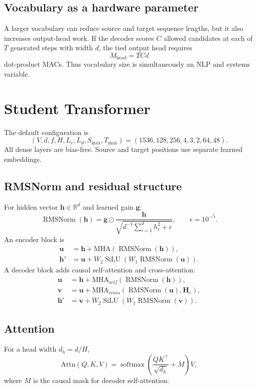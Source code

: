 \documentclass{article}
\newcommand{\R}{\mathbb{R}}
\newcommand{\rms}{\operatorname{RMSNorm}}
\newcommand{\softmax}{\operatorname{softmax}}
\newcommand{\silu}{\operatorname{SiLU}}
\begin{document}
\subsection{Vocabulary as a hardware parameter}
A larger vocabulary can reduce source and target sequence lengths, but it also increases output-head work. If the decoder scores $C$ allowed candidates at each of $T$ generated steps with width $d$, the tied output head requires
\begin{equation}
M_{\mathrm{head}}=TCd
\label{eq:head}
\end{equation}
dot-product MACs. Thus vocabulary size is simultaneously an NLP and systems variable.

\section{Student Transformer}
The default configuration is
\begin{equation}
(V,d,f,H,L_e,L_d,S_{\max},T_{\max})
=(1536,128,256,4,3,2,64,48).
\end{equation}
All dense layers are bias-free. Source and target positions use separate learned embeddings.

\subsection{RMSNorm and residual structure}
For hidden vector $\mathbf{h}\in\R^d$ and learned gain $\mathbf{g}$:
\begin{equation}
\rms(\mathbf{h})
=\mathbf{g}\odot
\frac{\mathbf{h}}
{\sqrt{d^{-1}\sum_{i=1}^{d}h_i^2+\epsilon}},
\qquad\epsilon=10^{-5}.
\end{equation}
An encoder block is
\begin{align}
\mathbf{u}&=\mathbf{h}+
\mathrm{MHA}(\rms(\mathbf{h})),\\
\mathbf{h}'&=\mathbf{u}+
W_2\silu(W_1\rms(\mathbf{u})).
\end{align}
A decoder block adds causal self-attention and cross-attention:
\begin{align}
\mathbf{u}&=\mathbf{h}+
\mathrm{MHA}_{self}(\rms(\mathbf{h})),\\
\mathbf{v}&=\mathbf{u}+
\mathrm{MHA}_{cross}(\rms(\mathbf{u}),\mathbf{H}_e),\\
\mathbf{h}'&=\mathbf{v}+
W_2\silu(W_1\rms(\mathbf{v})).
\end{align}

\subsection{Attention}
For a head width $d_h=d/H$,
\begin{equation}
\mathrm{Attn}(Q,K,V)
=\softmax\left(\frac{QK^\top}{\sqrt{d_h}}+M\right)V,
\end{equation}
where $M$ is the causal mask for decoder self-attention.
\end{document}
